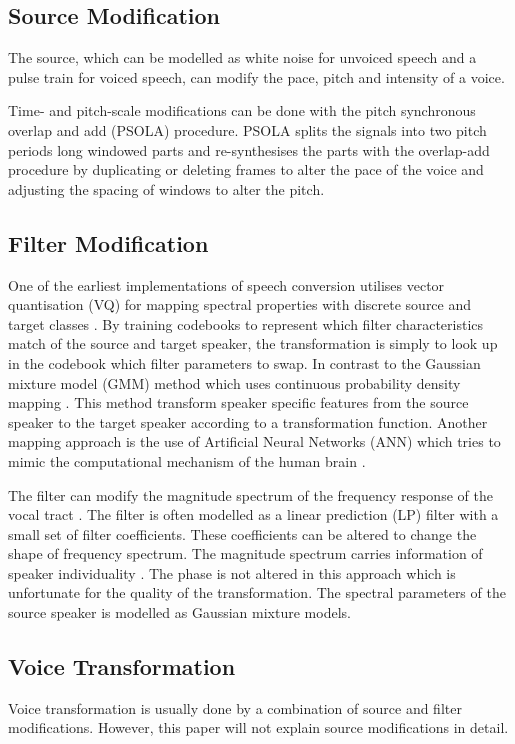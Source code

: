 \subsection{Source Modification} %
\label{sub:source_modification}
The source, which can be modelled as white noise for unvoiced speech and a pulse train for voiced speech, can modify the pace, pitch and intensity of a voice. 

Time- and pitch-scale modifications can be done with the pitch synchronous overlap and add (PSOLA) procedure. PSOLA splits the signals into two pitch periods long windowed parts and re-synthesises the parts with the overlap-add procedure by duplicating or deleting frames to alter the pace of the voice and adjusting the spacing of windows to alter the pitch.

\subsection{Filter Modification} %
\label{sub:filter_modification}
One of the earliest implementations of speech conversion utilises vector quantisation (VQ) for mapping spectral properties with discrete source and target classes \cite{abe88}. By training codebooks to represent which filter characteristics match of the source and target speaker, the transformation is simply to look up in the codebook which filter parameters to swap. In contrast to the Gaussian mixture model (GMM) method which uses continuous probability density mapping \cite{stylianou98}. This method transform speaker specific features from the source speaker to the target speaker according to a transformation function. Another mapping approach is the use of Artificial Neural Networks (ANN) which tries to mimic the computational mechanism of the human brain \cite{desai09,young75}.

The filter can modify the magnitude spectrum of the frequency response of the vocal tract \cite{nguyen09}. The filter is often modelled as a linear prediction (LP) filter with a small set of filter coefficients. These coefficients can be altered to change the shape of frequency spectrum. The magnitude spectrum carries information of speaker individuality \cite{stylianou09}. The phase is not altered in this approach which is unfortunate for the quality of the transformation. The spectral parameters of the source speaker is modelled as Gaussian mixture models.

\subsection{Voice Transformation} %
\label{sub:voice_transformation}
Voice transformation is usually done by a combination of source and filter modifications. However, this paper will not explain source modifications in detail.

